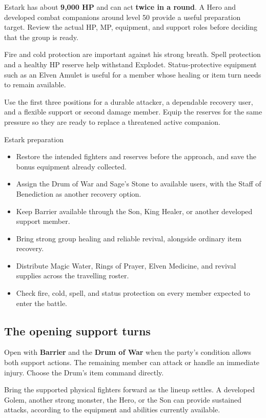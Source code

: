 Estark has about \textbf{9,000 HP} and can act
\textbf{twice in a round}. A Hero and developed
combat companions around level 50 provide a useful
preparation target. Review the actual HP, MP, equipment,
and support roles before deciding that the group is ready.

Fire and cold protection are important against his
strong breath. Spell protection and a healthy HP
reserve help withstand Explodet. Status-protective
equipment such as an Elven Amulet is useful for a
member whose healing or item turn needs to remain available.

Use the first three positions for a durable attacker,
a dependable recovery user, and a flexible support or
second damage member. Equip the reserves for the same
pressure so they are ready to replace a threatened
active companion.

\begin{routecheck}{Estark preparation}
\begin{itemize}
  \item Restore the intended fighters and reserves before
    the approach, and save the bonus equipment already collected.
  \item Assign the Drum of War and Sage's Stone to available
    users, with the Staff of Benediction as another recovery option.
  \item Keep Barrier available through the Son, King Healer,
    or another developed support member.
  \item Bring strong group healing and reliable revival,
    alongside ordinary item recovery.
  \item Distribute Magic Water, Rings of Prayer, Elven Medicine,
    and revival supplies across the travelling roster.
  \item Check fire, cold, spell, and status protection on
    every member expected to enter the battle.
\end{itemize}
\end{routecheck}

\subsection*{The opening support turns}

Open with \textbf{Barrier} and the \textbf{Drum of War}
when the party's condition allows both support actions.
The remaining member can attack or handle an immediate
injury. Choose the Drum's item command directly.

Bring the supported physical fighters forward as the
lineup settles. A developed Golem, another strong monster,
the Hero, or the Son can provide sustained attacks,
according to the equipment and abilities currently available.

